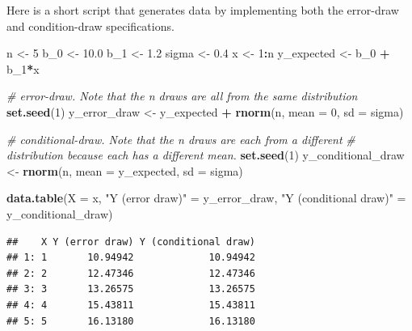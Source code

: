 \documentclass[]{book}
\newenvironment{Shaded}{\begin{snugshade}}{\end{snugshade}}
\newcommand{\CommentTok}[1]{\textcolor[rgb]{0.56,0.35,0.01}{\textit{#1}}}
\newcommand{\DataTypeTok}[1]{\textcolor[rgb]{0.13,0.29,0.53}{#1}}
\newcommand{\DecValTok}[1]{\textcolor[rgb]{0.00,0.00,0.81}{#1}}
\newcommand{\FloatTok}[1]{\textcolor[rgb]{0.00,0.00,0.81}{#1}}
\newcommand{\KeywordTok}[1]{\textcolor[rgb]{0.13,0.29,0.53}{\textbf{#1}}}
\newcommand{\NormalTok}[1]{#1}
\newcommand{\OperatorTok}[1]{\textcolor[rgb]{0.81,0.36,0.00}{\textbf{#1}}}
\newcommand{\StringTok}[1]{\textcolor[rgb]{0.31,0.60,0.02}{#1}}
\begin{document}
Here is a short script that generates data by implementing both the error-draw and condition-draw specifications.

\begin{Shaded}
\begin{Highlighting}[]
\NormalTok{n <-}\StringTok{ }\DecValTok{5}
\NormalTok{b_}\DecValTok{0}\NormalTok{ <-}\StringTok{ }\FloatTok{10.0}
\NormalTok{b_}\DecValTok{1}\NormalTok{ <-}\StringTok{ }\FloatTok{1.2}
\NormalTok{sigma <-}\StringTok{ }\FloatTok{0.4}
\NormalTok{x <-}\StringTok{ }\DecValTok{1}\OperatorTok{:}\NormalTok{n}
\NormalTok{y_expected <-}\StringTok{ }\NormalTok{b_}\DecValTok{0} \OperatorTok{+}\StringTok{ }\NormalTok{b_}\DecValTok{1}\OperatorTok{*}\NormalTok{x}

\CommentTok{# error-draw. Note that the n draws are all from the same distribution}
\KeywordTok{set.seed}\NormalTok{(}\DecValTok{1}\NormalTok{)}
\NormalTok{y_error_draw <-}\StringTok{ }\NormalTok{y_expected }\OperatorTok{+}\StringTok{ }\KeywordTok{rnorm}\NormalTok{(n, }\DataTypeTok{mean =} \DecValTok{0}\NormalTok{, }\DataTypeTok{sd =}\NormalTok{ sigma)}

\CommentTok{# conditional-draw. Note that the n draws are each from a different}
\CommentTok{# distribution because each has a different mean.}
\KeywordTok{set.seed}\NormalTok{(}\DecValTok{1}\NormalTok{)}
\NormalTok{y_conditional_draw <-}\StringTok{ }\KeywordTok{rnorm}\NormalTok{(n, }\DataTypeTok{mean =}\NormalTok{ y_expected, }\DataTypeTok{sd =}\NormalTok{ sigma)}

\KeywordTok{data.table}\NormalTok{(}\DataTypeTok{X =}\NormalTok{ x,}
           \StringTok{"Y (error draw)"}\NormalTok{ =}\StringTok{ }\NormalTok{y_error_draw,}
           \StringTok{"Y (conditional draw)"}\NormalTok{ =}\StringTok{ }\NormalTok{y_conditional_draw)}
\end{Highlighting}
\end{Shaded}

\begin{verbatim}
##    X Y (error draw) Y (conditional draw)
## 1: 1       10.94942             10.94942
## 2: 2       12.47346             12.47346
## 3: 3       13.26575             13.26575
## 4: 4       15.43811             15.43811
## 5: 5       16.13180             16.13180
\end{verbatim}
\end{document}
